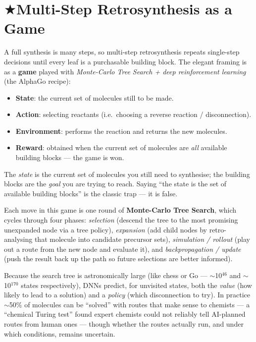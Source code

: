 \documentclass[11pt, oneside]{book}
\makeatletter
\newcommand{\starglyph}{\textcolor{stargold}{\ensuremath{\bigstar}}}
\newcommand{\starsec}[1]{%
  \texorpdfstring{\starglyph\hspace{0.4em}\textcolor{star@frame}{#1}}{#1}}
\makeatother
\begin{document}
\section{\starsec{Multi-Step Retrosynthesis as a Game}}

A full synthesis is many steps, so multi-step retrosynthesis repeats single-step
decisions until every leaf is a purchasable building block. The elegant framing is
as a \textbf{game} played with \emph{Monte-Carlo Tree Search + deep reinforcement
learning} (the AlphaGo recipe):

\begin{thmbox}[title={The retrosynthesis ``game''}]
\begin{itemize}
  \item \textbf{State}: the current set of molecules still to be made.
  \item \textbf{Action}: selecting reactants (i.e.\ choosing a reverse reaction /
        disconnection).
  \item \textbf{Environment}: performs the reaction and returns the new molecules.
  \item \textbf{Reward}: obtained when the current set of molecules are \emph{all}
        available building blocks --- the game is won.
\end{itemize}
\end{thmbox}

\begin{notebox}[title={State vs.\ building blocks --- don't swap them}]
The \emph{state} is the current set of molecules you still need to synthesise; the
building blocks are the \emph{goal} you are trying to reach. Saying ``the state is
the set of available building blocks'' is the classic trap --- it is false.
\end{notebox}

Each move in this game is one round of \textbf{Monte-Carlo Tree Search}, which cycles
through four phases: \emph{selection} (descend the tree to the most promising
unexpanded node via a tree policy), \emph{expansion} (add child nodes by retro-analysing
that molecule into candidate precursor sets), \emph{simulation / rollout} (play out a
route from the new node and evaluate it), and \emph{backpropagation / update} (push the
result back up the path so future selections are better informed).

Because the search tree is astronomically large (like chess or Go --- $\sim$10$^{46}$
and $\sim$10$^{170}$ states respectively), DNNs predict, for unvisited states, both the
\emph{value} (how likely to lead to a solution) and a \emph{policy} (which disconnection
to try). In practice $\sim$50\% of molecules can
be ``solved'' with routes that make sense to chemists --- a ``chemical Turing test''
found expert chemists could not reliably tell AI-planned routes from human ones ---
though whether the routes actually run, and under which conditions, remains uncertain.
\end{document}
